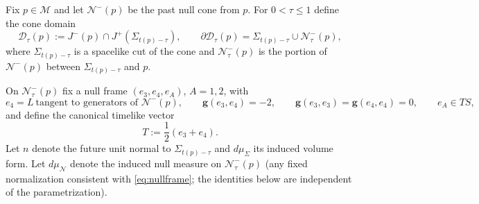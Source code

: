 \documentclass{amsart}
\begin{document}
{\noindent Fix $p\in\mathcal M$ and let $\mathcal N^-(p)$ be the past null cone from $p$.
For $0<\tau\le 1$ define the cone domain
\begin{equation}\label{eq:Dtau}
\mathcal D_\tau(p):=J^-(p)\cap J^+(\Sigma_{t(p)-\tau}),
\qquad
\partial\mathcal D_\tau(p)=\Sigma_{t(p)-\tau}\cup\mathcal N^-_\tau(p),
\end{equation}
where $\Sigma_{t(p)-\tau}$ is a spacelike cut of the cone and $\mathcal N^-_\tau(p)$ is the portion
of $\mathcal N^-(p)$ between $\Sigma_{t(p)-\tau}$ and $p$.

\noindent On $\mathcal N^-_\tau(p)$ fix a null frame $(e_3,e_4,e_A)$, $A=1,2$, with
\begin{equation}\label{eq:nullframe}
e_4=L \ \text{tangent to generators of }\mathcal N^-(p),\qquad
\mathbf g(e_3,e_4)=-2,\qquad
\mathbf g(e_3,e_3)=\mathbf g(e_4,e_4)=0,\qquad
e_A\in TS,
\end{equation}
and define the canonical timelike vector
\begin{equation}\label{eq:Tcanon}
T:=\frac12(e_3+e_4).
\end{equation}
Let $n$ denote the future unit normal to $\Sigma_{t(p)-\tau}$ and $d\mu_{\Sigma}$ its induced volume form.
Let $d\mu_{\mathcal N}$ denote the induced null measure on $\mathcal N^-_\tau(p)$ (any fixed normalization
consistent with \eqref{eq:nullframe}; the identities below are independent of the parametrization).

}
\end{document}
